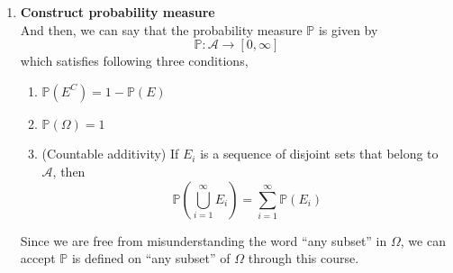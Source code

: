 \documentclass[twoside]{article}
\theoremstyle{definition}
\theoremstyle{remark}
\begin{document}
\begin{enumerate}
\item
\textbf{Construct probability measure}
\\[1.0\baselineskip]
And then, we can say that the probability measure $\mathbb{P}$ is given by
$$
\mathbb{P}: \mathcal{A} \rightarrow [0, \infty]
$$
which satisfies following three conditions,
\begin{enumerate}
  \item $\mathbb{P}(E^C) = 1 - \mathbb{P}(E)$
  \item $\mathbb{P}(\Omega) = 1$
  \item (Countable additivity) If $E_i$ is a sequence of disjoint sets that belong
        to $\mathcal{A}$, then
        $$
        \mathbb{P}(\bigcup_{i=1}^{\infty} E_i) = \sum_{i=1}^{\infty} \mathbb{P}(E_i)
        $$
\end{enumerate}

Since we are free from misunderstanding the word ``any subset'' in $\Omega$, we
can accept $\mathbb{P}$ is defined on ``any subset'' of $\Omega$ through this
course.
\end{enumerate}








\clearpage
\printbibliography

\end{document}
